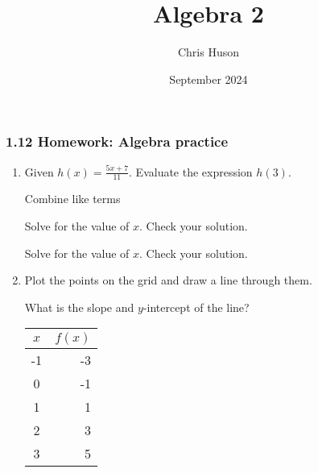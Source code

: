 \documentclass[12pt, twoside]{article}
\title{Algebra 2}
\author{Chris Huson}
\date{September 2024}
\begin{document}
\subsubsection*{1.12 Homework: Algebra practice }
\begin{enumerate}

 \vspace{3cm}

\item Given $\displaystyle h(x)=\frac{5x+7}{11}$. Evaluate the expression $h(3)$. \vspace{3cm}

Combine like terms
 \vspace{4cm}

Solve for the value of $x$. Check your solution.
 \vspace{4.5cm}

\newpage
Solve for the value of $x$. Check your solution.
 \vspace{6cm}

\item Plot the points on the grid and draw a line through them.
  \begin{multicols}{2}
    What is the slope and $y$-intercept of the line?
    \begin{flushleft}
      \begin{tabular}{|c|r|}
      \hline
      $x$ & $f(x)$\\
      \hline
      -1 & -3 \\
      \hline
      0 & -1 \\
      \hline
      1 & 1 \\
      \hline
      2 & 3 \\
      \hline
      3 & 5 \\
      \hline
      \end{tabular}
    \end{flushleft}
    \columnbreak


\end{multicols}
\end{enumerate}
\end{document}
